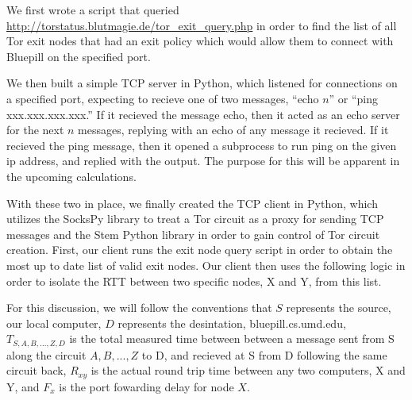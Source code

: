 \documentclass[twocolumn,11pt]{article}
\begin{document}
We first wrote a script that queried \href{http://torstatus.blutmagie.de/tor\_exit\_query.php}{http://torstatus.blutmagie.de/tor\_exit\_query.php}  in order to find the list of all Tor exit nodes that had an exit policy which would allow them to connect with Bluepill on the specified port. 

We then built a simple TCP server in Python, which listened for connections on a specified port, expecting to recieve one of two messages, ``echo $n$'' or ``ping xxx.xxx.xxx.xxx.'' If it recieved the message echo, then it acted as an echo server for the next $n$ messages, replying with an echo of any message it recieved. If it recieved the ping message, then it opened a subprocess to run ping on the given ip address, and replied with the output. The purpose for this will be apparent in the upcoming calculations.

With these two in place, we finally created the TCP client in Python, which utilizes the SocksPy library to treat a Tor circuit as a proxy for sending TCP messages and the Stem Python library in order to gain control of Tor circuit creation. First, our client runs the exit node query script in order to obtain the most up to date list of valid exit nodes. Our client then uses the following logic in order to isolate the RTT between two specific nodes, X and Y, from this list. 

For this discussion, we will follow the conventions that $S$ represents the source, our local computer, $D$ represents the desintation, bluepill.cs.umd.edu, $T_{S,A,B,...,Z,D}$ is the total measured time between between a message sent from S along the circuit $A,B,...,Z$ to D, and recieved at S from D following the same circuit back, $R_{xy}$ is the actual round trip time between any two computers, X and Y, and $F_x$ is the port fowarding delay for node $X$.
\end{document}
